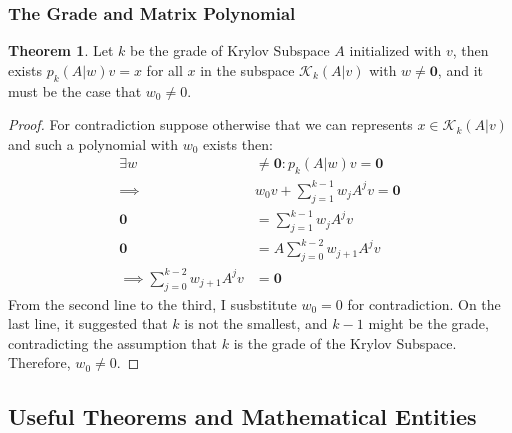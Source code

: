 \documentclass[]{article}
\theoremstyle{definition}
\newtheorem{theorem}{Theorem}            %
\begin{document}
        \subsubsection{The Grade and Matrix Polynomial}
            \begin{theorem}\label{theorem:2}
                Let $k$ be the grade of Krylov Subspace $A$ initialized with $v$, then exists $p_{k}(A|w)v = x$ for all $x$ in the subspace $\mathcal K_k(A|v)$ with $w\neq \mathbf 0$, and it must be the case that $w_0\neq 0$.
            \end{theorem}
            \begin{proof}
                For contradiction suppose otherwise that we can represents $x\in \mathcal K_k(A|v)$  and such a polynomial with $w_0$ exists then: 
                \begin{align}
                    \exists w &\neq \mathbf 0 : p_{k}(A|w)v = \mathbf 0 
                    \\
                    \implies& w_0v + \sum_{j = 1}^{k - 1} w_jA^jv = \mathbf 0
                    \\
                    \mathbf 0 &=\sum_{j = 1}^{k - 1} w_jA^jv
                    \\
                    \mathbf 0 &= A\sum_{j = 0}^{k - 2} w_{j + 1}A^jv
                    \\
                    \implies \sum_{j = 0}^{k - 2} w_{j + 1}A^jv &= \mathbf 0 
                \end{align}
                From the second line to the third, I susbstitute $w_0 = 0$ for contradiction. On the last line, it suggested that $k$ is not the smallest, and $k - 1$ might be the grade, contradicting the assumption that $k$ is the grade of the Krylov Subspace. Therefore, $w_0 \neq 0 $. 
            \end{proof}
    \subsection{Useful Theorems and Mathematical Entities}
\end{document}
